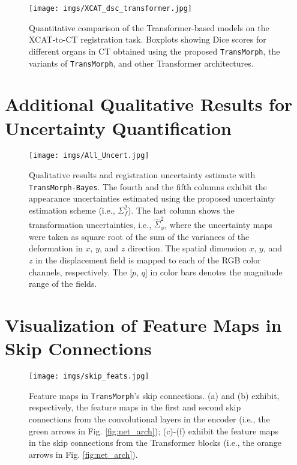 \documentclass[times,twocolumn,final]{elsarticle}
\begin{document}
\begin{figure*}[!htp]
\centering
\texttt{[image: imgs/XCAT\_dsc\_transformer.jpg]}
\caption{Quantitative comparison of the Transformer-based models on the XCAT-to-CT registration task. Boxplots showing Dice scores for different organs in CT obtained using the proposed \texttt{TransMorph}, the variants of \texttt{TransMorph}, and other Transformer architectures.\label{fig:xcat_brain_transformer}}
\end{figure*}
\newpage
\section{Additional Qualitative Results for Uncertainty Quantification}
\begin{figure*}[!htp]
\centering
\texttt{[image: imgs/All\_Uncert.jpg]}
\caption{Qualitative results and registration uncertainty estimate with \texttt{TransMorph-Bayes}. The fourth and the fifth columns exhibit the appearance uncertainties estimated using the proposed uncertainty estimation scheme (i.e., $\Sigma_f^2$). The last column shows the transformation uncertainties, i.e., $\hat{\Sigma}_\phi^2$, where the uncertainty maps were taken as square root of the sum of the variances of the deformation in $x$, $y$,
and $z$ direction. The spatial dimension $x$, $y$, and $z$ in the displacement field is mapped to each of the RGB color channels, respectively. The [$p$, $q$] in color bars denotes the magnitude range of the fields. \label{fig:jhu_brain_uncert}}
\end{figure*}
\newpage

\section{Visualization of Feature Maps in Skip Connections}
\begin{figure*}[!htp]
\centering
\texttt{[image: imgs/skip\_feats.jpg]}
\caption{Feature maps in \texttt{TransMorph}'s skip connections. (a) and (b) exhibit, respectively, the feature maps in the first and second skip connections from the convolutional layers in the encoder (i.e., the green arrows in Fig. \ref{fig:net_arch}); (c)-(f) exhibit the feature maps in the skip connections from the Transformer blocks (i.e., the orange arrows in Fig. \ref{fig:net_arch}).\label{fig:skip_feat}}
\end{figure*}
\end{document}
